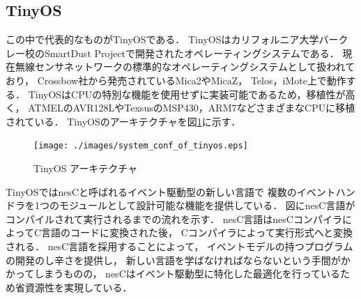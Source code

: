 \subsection{TinyOS}
この中で代表的なものがTinyOS\cite{Hill:2000:SAD:356989.356998}\cite{Levis04tinyos:an}である．
TinyOSはカリフォルニア大学バークレー校のSmartDust Projectで開発されたオペレーティングシステムである．
現在無線センサネットワークの標準的なオペレーティングシステムとして扱われており，
Crossbow社から発売されているMica2やMicaZ\cite{Hill:2002:MWP:623308.624560}，
Telos\cite{Polastre:2005:TEU:1147685.1147744}，iMote\cite{Nachman:2005:IMP:1147685.1147760}上で動作する．
TinyOSはCPUの特別な機能を使用せずに実装可能であるため，移植性が高く，
ATMELのAVR128LやTexsusのMSP430，ARM7などさまざまなCPUに移植されている．
TinyOSのアーキテクチャを図\ref{fig:system_conf_of_tinyos}に示す．

\begin{figure}[htbp]
 \begin{center}
  \texttt{[image: ./images/system\_conf\_of\_tinyos.eps]}
 \end{center}
 \caption{TinyOS アーキテクチャ}
 \label{fig:system_conf_of_tinyos}
\end{figure}

TinyOSではnesC\cite{Gay:2003:NLH:781131.781133}と呼ばれるイベント駆動型の新しい言語で
複数のイベントハンドラを1つのモジュールとして設計可能な機能を提供している．
図にnesC言語がコンパイルされて実行されるまでの流れを示す．
nesC言語はnesCコンパイラによってC言語のコードに変換された後，
Cコンパイラによって実行形式へと変換される．
nesC言語を採用することによって，
イベントモデルの持つプログラムの開発のし辛さを提供し，
新しい言語を学ばなければならないという手間がかかってしまうものの，
nesCはイベント駆動型に特化した最適化を行っているため省資源性を実現している．



